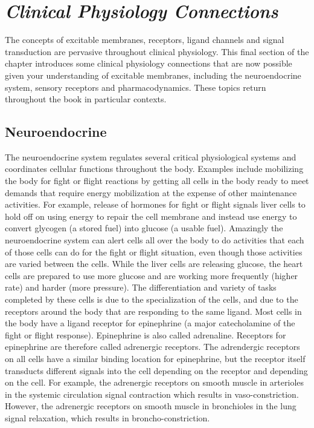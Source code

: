 \section{\textit{Clinical Physiology Connections}}

The concepts of excitable membranes, receptors, ligand channels and signal transduction are pervasive throughout clinical physiology. This final section of the chapter introduces some clinical physiology connections that are now possible given your understanding of excitable membranes, including the neuroendocrine system, sensory receptors and pharmacodynamics. These topics return throughout the book in particular contexts.

\subsection{Neuroendocrine}

The neuroendocrine system regulates several critical physiological systems and coordinates cellular functions throughout the body. Examples include mobilizing the body for fight or flight reactions by getting all cells in the body ready to meet demands that require energy mobilization at the expense of other maintenance activities. For example, release of hormones for fight or flight signals liver cells to hold off on using energy to repair the cell membrane and instead use energy to convert glycogen (a stored fuel) into glucose (a usable fuel). Amazingly the neuroendocrine system can alert cells all over the body to do activities that each of those cells can do for the fight or flight situation, even though those activities are varied between the cells. While the liver cells are releasing glucose, the heart cells are prepared to use more glucose and are working more frequently (higher rate) and harder (more pressure). The differentiation and variety of tasks completed by these cells is due to the specialization of the cells, and due to the receptors around the body that are responding to the same ligand. Most cells in the body have a ligand receptor for epinephrine (a major catecholamine of the fight or flight response). Epinephrine is also called adrenaline. Receptors for epinephrine are therefore called adrenergic receptors. The adrendergic receptors on all cells have a similar binding location for epinephrine, but the receptor itself transducts different signals into the cell depending on the receptor and depending on the cell. For example, the adrenergic receptors on smooth muscle in arterioles in the systemic circulation signal contraction which results in vaso-constriction. However, the adrenergic receptors on smooth muscle in bronchioles in the lung signal relaxation, which results in broncho-constriction.

